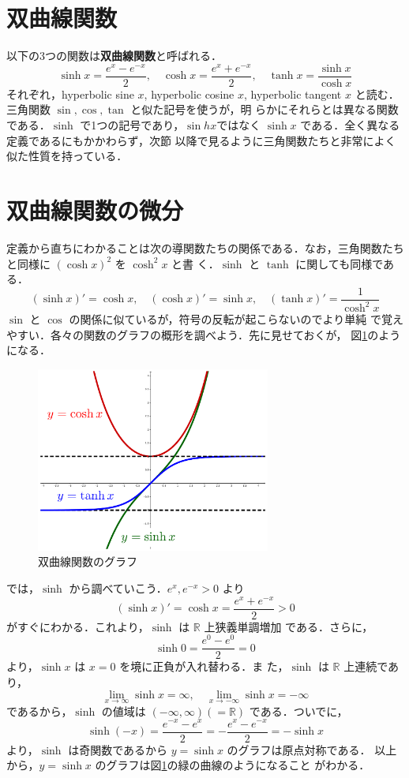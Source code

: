 \documentclass[dvipdfmx,12pt, uplatex]{jsarticle}
\begin{document}
\rhead{}
\lhead{}


\section{双曲線関数}

以下の3つの関数は\textbf{双曲線関数}と呼ばれる．
\[
  \sinh x = \frac{e^{x} - e^{-x}}{2}, \quad
  \cosh x = \frac{e^{x} + e^{-x}}{2}, \quad
  \tanh x = \frac{\sinh x}{\cosh x}
\]
それぞれ，hyperbolic sine $x$, hyperbolic cosine $x$, hyperbolic
tangent $x$ と読む．三角関数 $\sin, \cos, \tan$ と似た記号を使うが，明
らかにそれらとは異なる関数である．$\sinh$ で1つの記号であり，$\sin
hx$ではなく $\sinh x$ である．全く異なる定義であるにもかかわらず，次節
以降で見るように三角関数たちと非常によく似た性質を持っている．

\section{双曲線関数の微分}
定義から直ちにわかることは次の導関数たちの関係である．なお，三角関数たち
と同様に $\left(\cosh x\right)^2$ を $\cosh^2 x$ と書
く．$\sinh$ と $\tanh$ に関しても同様である．
\[
  \left( \sinh x\right)' = \cosh x, \quad
  \left( \cosh x\right)' = \sinh x, \quad
  \left( \tanh x\right)' = \frac{1}{\cosh^2 x}
\]
$\sin$ と $\cos$ の関係に似ているが，符号の反転が起こらないのでより単純
で覚えやすい．各々の関数のグラフの概形を調べよう．先に見せておくが，
図\ref{graph}のようになる．
\begin{figure}[h]
  \begin{center}
    \includegraphics[width=7.7cm]{./pictures/graph.pdf}
    \caption{双曲線関数のグラフ}\label{graph}
  \end{center}
\end{figure}


では，$\sinh$ から調べていこう．$e^{x}, e^{-x}>0$ より
\[
  \left( \sinh x \right)'= \cosh x = \frac{e^{x} + e^{-x}}{2} >0
\]
がすぐにわかる．これより，$\sinh$ は $\mathbb{R}$ 上狭義単調増加
である．さらに，
\[
  \sinh 0 = \frac{e^0 - e^{0}}{2} = 0
\]
より，$\sinh x$ は $x=0$ を境に正負が入れ替わる．ま
た，$\sinh$ は $\mathbb{R}$ 上連続であり，
\[
  \lim_{x \to \infty} \sinh x = \infty, \quad  \lim_{x \to -\infty} \sinh x = -\infty
\]
であるから，$\sinh$ の値域は $(-\infty, \infty) \left( =
  \mathbb{R}\right)$ である．ついでに，
\[
\sinh (-x) = \frac{e^{-x} - e^{x}}{2} = -\frac{e^{x}-e^{-x}}{2} = -\sinh x
\]
より，$\sinh$ は奇関数であるから $y=\sinh x$ のグラフは原点対称である．
以上から，$y=\sinh x$ のグラフは図\ref{graph}の緑の曲線のようになること
がわかる．
\end{document}
